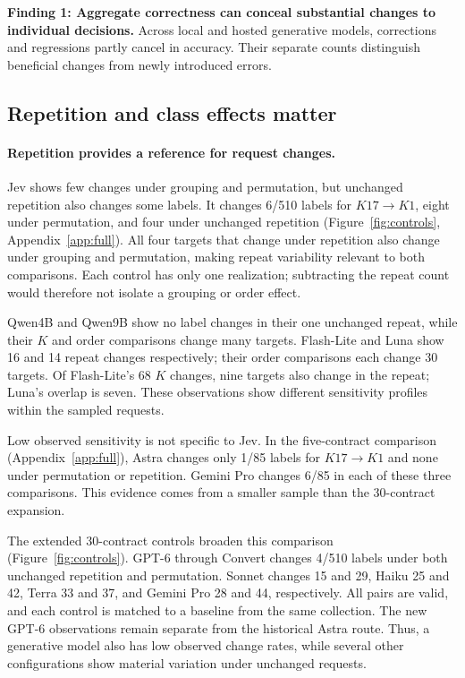 \textbf{Finding 1: Aggregate correctness can conceal substantial changes to individual decisions.} Across local and hosted generative models, corrections and regressions partly cancel in accuracy. Their separate counts distinguish beneficial changes from newly introduced errors.



\subsection{Repetition and class effects matter}
\paragraph{Repetition provides a reference for request changes.}
Jev shows few changes under grouping and permutation, but unchanged repetition also changes some labels. It changes 6/510 labels for $K17\to K1$, eight under permutation, and four under unchanged repetition (Figure~\ref{fig:controls}, Appendix~\ref{app:full}). All four targets that change under repetition also change under grouping and permutation, making repeat variability relevant to both comparisons. Each control has only one realization; subtracting the repeat count would therefore not isolate a grouping or order effect.

Qwen4B and Qwen9B show no label changes in their one unchanged repeat, while their $K$ and order comparisons change many targets. Flash-Lite and Luna show 16 and 14 repeat changes respectively; their order comparisons each change 30 targets. Of Flash-Lite's 68 $K$ changes, nine targets also change in the repeat; Luna's overlap is seven. These observations show different sensitivity profiles within the sampled requests.

Low observed sensitivity is not specific to Jev. In the five-contract comparison (Appendix~\ref{app:full}), Astra changes only 1/85 labels for $K17\to K1$ and none under permutation or repetition. Gemini Pro changes 6/85 in each of these three comparisons. This evidence comes from a smaller sample than the 30-contract expansion.

The extended 30-contract controls broaden this comparison (Figure~\ref{fig:controls}). GPT-6 through Convert changes 4/510 labels under both unchanged repetition and permutation. Sonnet changes 15 and 29, Haiku 25 and 42, Terra 33 and 37, and Gemini Pro 28 and 44, respectively. All pairs are valid, and each control is matched to a baseline from the same collection. The new GPT-6 observations remain separate from the historical Astra route. Thus, a generative model also has low observed change rates, while several other configurations show material variation under unchanged requests.

